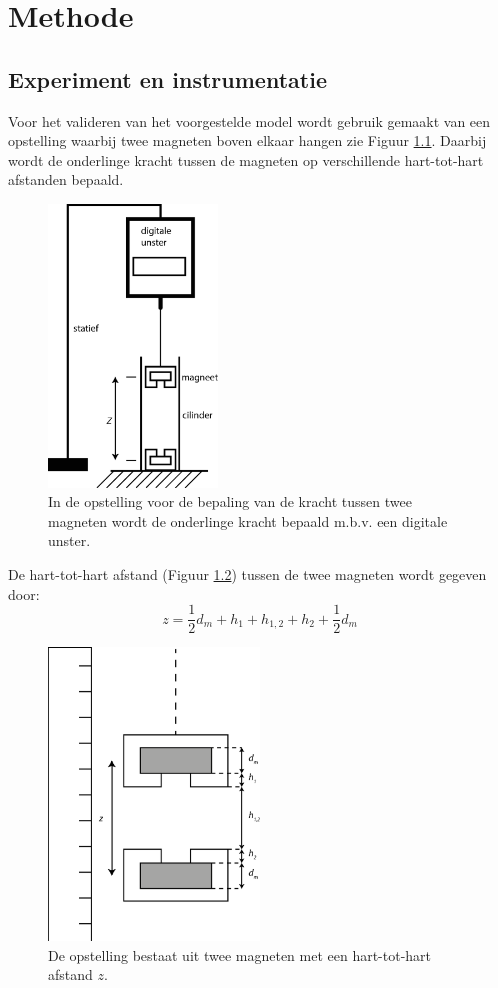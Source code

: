 \chapter{Methode}
\section{Experiment en instrumentatie}
Voor het valideren van het voorgestelde model wordt gebruik gemaakt van een opstelling waarbij twee magneten boven elkaar hangen zie Figuur \ref{fig:IE1:opstelling}. Daarbij wordt de onderlinge kracht tussen de magneten op verschillende hart-tot-hart afstanden bepaald.

\begin{figure}[H]
    \centering
    \includegraphics[width=0.4\textwidth]{Figures/IE1_opstelling.eps}
    \caption{In de opstelling voor de bepaling van de kracht tussen twee magneten wordt de onderlinge kracht bepaald m.b.v. een digitale unster.}
    \label{fig:IE1:opstelling}
\end{figure}
De hart-tot-hart afstand (Figuur \ref{fig:IE1:opstellingr}) tussen de twee magneten wordt gegeven door:
\begin{equation}
    z = \frac{1}{2}d_m+h_1+h_{1,2}+h_2+\frac{1}{2} d_m
\end{equation}
\begin{figure}
    \centering
    \includegraphics[width=0.5\textwidth]{Figures/ie1_opst_onz.eps}
    \caption{De opstelling bestaat uit twee magneten met een hart-tot-hart afstand $z$.}
    \label{fig:IE1:opstellingr}
\end{figure}

